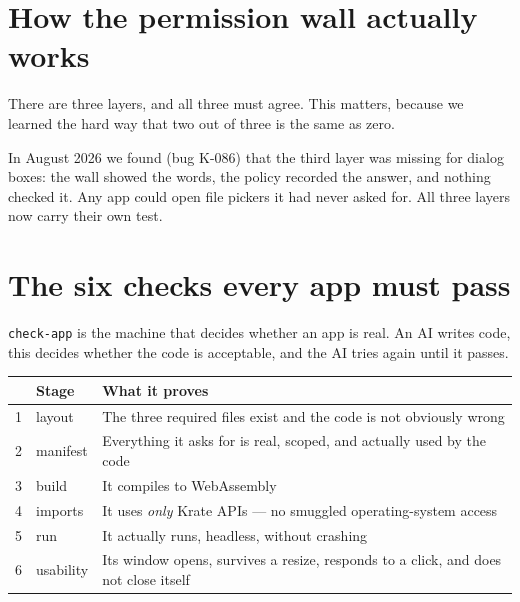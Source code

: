 \documentclass[11pt,a4paper]{report}
\begin{document}
\section{How the permission wall actually works}

There are three layers, and all three must agree. This matters, because we
learned the hard way that two out of three is the same as zero.

\begin{center}
\end{center}

In August 2026 we found (bug K-086) that the third layer was missing for
dialog boxes: the wall showed the words, the policy recorded the answer,
and nothing checked it. Any app could open file pickers it had never asked
for. All three layers now carry their own test.

\section{The six checks every app must pass}

\texttt{check-app} is the machine that decides whether an app is real. An
AI writes code, this decides whether the code is acceptable, and the AI
tries again until it passes.

\begin{center}
\begin{tabular}{clp{8.6cm}}
\toprule
& \textbf{Stage} & \textbf{What it proves} \\
\midrule
1 & layout & The three required files exist and the code is not obviously wrong \\
2 & manifest & Everything it asks for is real, scoped, and actually used by the code \\
3 & build & It compiles to WebAssembly \\
4 & imports & It uses \emph{only} Krate APIs --- no smuggled operating-system access \\
5 & run & It actually runs, headless, without crashing \\
6 & usability & Its window opens, survives a resize, responds to a click, and does not close itself \\
\bottomrule
\end{tabular}
\end{center}
\end{document}
